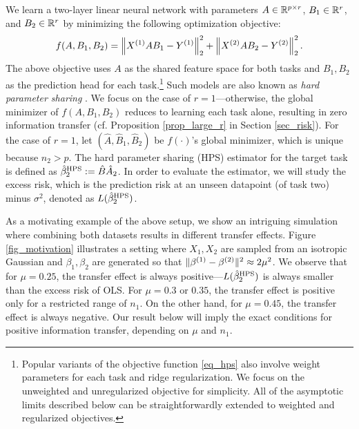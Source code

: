 We learn a two-layer linear neural network with parameters $A \in \mathbb{R}^{p\times r}$, $B_1 \in \mathbb{R}^{r}$, and $B_2 \in \mathbb{R}^r$ by minimizing the following optimization objective:
\begin{align}\label{eq_hps}
    f(A, B_1, B_2) = \bignorm{X^{(1)} A B_1 - Y^{(1)}}_2^2 + \bignorm{X^{(2)} A B_2 - Y^{(2)}}_2^2.
\end{align}
The above objective uses $A$ as the shared feature space for both tasks and $B_1, B_2$ as the prediction head for each task.\footnote{Popular variants of the objective function \eqref{eq_hps} also involve weight parameters for each task and ridge regularization. We focus on the unweighted and unregularized objective for simplicity. All of the asymptotic limits described below can be straightforwardly extended to weighted and regularized objectives.}
Such models are also known as \textit{hard parameter sharing} \cite{C97,R17}.
We focus on the case of $r = 1$---otherwise, the global minimizer of $f(A, B_1, B_2)$ reduces to learning each task alone, resulting in zero information transfer (cf. Proposition \ref{prop_large_r} in Section \ref{sec_risk}).
For the case of $r = 1$, let $(\hat{A}, \hat{B}_1, \hat{B}_2)$ be $f(\cdot)$'s global minimizer, which is unique because $n_2 > p$.
The hard parameter sharing (HPS) estimator for the target task is defined as $\hat{\beta}_2^{\textup{HPS}} := \hat{B} \hat{A}_2$.
In order to evaluate the estimator, we will study the excess risk, which is the prediction risk at an unseen datapoint (of task two) minus $\sigma^2$, denoted as $L(\hat{\beta}_2^{\textup{HPS}})$.

As a motivating example of the above setup, we show an intriguing simulation where combining both datasets results in different transfer effects.
Figure \ref{fig_motivation} illustrates a setting where $X_1, X_2$ are sampled from an isotropic Gaussian and $\beta_1,\beta_2$ are generated so that $\|\beta^{(1)} - \beta^{(2)}\|^2 \approx 2\mu^2$.
We observe that for $\mu = 0.25$, the transfer effect is always positive---$L(\hat{\beta}_2^{\textup{HPS}})$ is always smaller than the excess risk of OLS.
For $\mu = 0.3$ or $0.35$, the transfer effect is positive only for a restricted range of $n_1$.
On the other hand, for $\mu = 0.45$, the transfer effect is always negative.  
Our result below will imply the exact conditions for positive information transfer, depending on $\mu$ and $n_1$.



